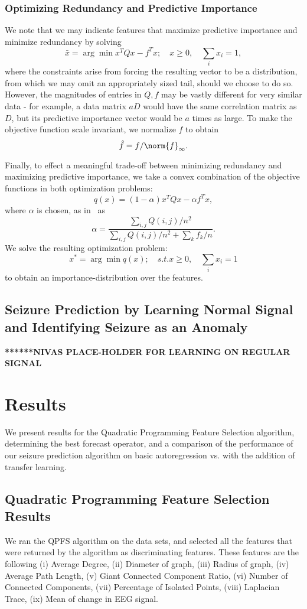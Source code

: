 \documentclass{article} %
\renewcommand{\a}{\alpha}
\begin{document}
\subsubsection{Optimizing Redundancy and Predictive Importance}
We note that we may indicate features that maximize predictive importance and minimize redundancy by solving 
\[ \bar{x} = \arg \min x^T Q x - f^T x; \quad x \geq 0, \quad \sum_i x_i  = 1, \]
where the constraints arise from forcing the resulting vector to be a distribution, from which we may omit an appropriately sized tail, should we choose to do so. However, the magnitudes of entries in $Q, f$ may be vastly different for very similar data - for example, a data matrix $aD$ would have the same correlation matrix as $D$, but its predictive importance vector would be $a$ times as large. To make the objective function scale invariant, we normalize $f$ to obtain
\[ \hat{f} = f/\norm{f}_{\infty}. \]

Finally, to effect a meaningful trade-off between minimizing redundancy and maximizing predictive importance, we take a convex combination of the objective functions in both optimization problems:
\[ q(x) = (1 - \a) x^T Q x - \a  f^T x, \]
where $\a$ is chosen, as in~\cite{quadprog_featsel} as 
\[ \a  = \frac{\sum_{i, j} Q(i, j) /n^2}{\sum_{i, j} Q(i, j)/n^2 + \sum_k f_k / n}. \]
We solve the resulting optimization problem:
\[ x^* = \arg \min q(x); \quad s.t. x \geq 0, \quad \sum_i x_i = 1 \]
to obtain an importance-distribution over the features.

\subsection{Seizure Prediction by Learning Normal Signal and Identifying Seizure as an Anomaly} \label{sec:seizure_predict_method}
\textbf{******NIVAS PLACE-HOLDER FOR LEARNING ON REGULAR SIGNAL }

\section{Results} \label{sec:results}
We present results for the Quadratic Programming Feature Selection algorithm, determining the best forecast operator, and a comparison of the performance of our seizure prediction algorithm on basic autoregression vs. with the addition of transfer learning.

\subsection{Quadratic Programming Feature Selection Results}
We ran the QPFS algorithm on the data sets, and selected all the features that were returned by the algorithm as discriminating features.  These features are the following (i) Average Degree, (ii) Diameter of graph, (iii) Radius of graph, (iv) Average Path Length, (v) Giant Connected Component Ratio, (vi) Number of Connected Components, (vii) Percentage of Isolated Points, (viii) Laplacian Trace, (ix) Mean of change in EEG signal.
\end{document}
